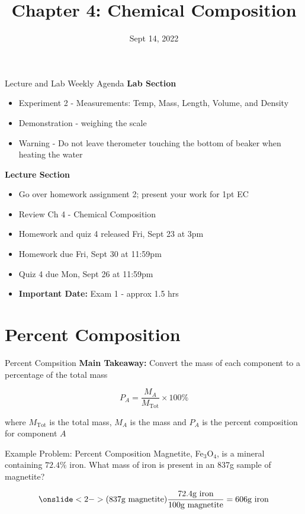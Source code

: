 \documentclass[11pt]{beamer}
\title{Chapter 4: Chemical Composition}
\institute{Chemistry Department, Cypress College}
\date{Sept 14, 2022}
\begin{document}
\begin{frame}
  \titlepage
\end{frame}

\begin{frame}{Lecture and Lab Weekly Agenda}
  \textbf{Lab Section}

  \begin{itemize}
  \item Experiment 2 - Measurements: Temp, Mass, Length, Volume,
    and Density
  \item Demonstration - weighing the scale
  \item Warning - Do not leave therometer touching the
    bottom of beaker when heating the water
  \end{itemize}

  \textbf{Lecture Section}

  \begin{itemize}
  \item Go over homework assignment 2; present your work
    for 1pt EC
  \item Review Ch 4 - Chemical Composition
  \item Homework and quiz 4 released Fri, Sept 23 at 3pm
  \item Homework due Fri, Sept 30 at 11:59pm
  \item Quiz 4 due Mon, Sept 26 at 11:59pm
  \item \textbf{Important Date:} Exam 1 - approx 1.5 hrs
  \end{itemize}
\end{frame}

\section{Percent Composition}

\begin{frame}{Percent Compsition}
  \textbf{Main Takeaway:} Convert the mass of each component
  to a percentage of the total mass

  \begin{equation}
    P_A = \frac{M_A}{M_\text{Tot}} \times 100\%
  \end{equation}

  where $M_\text{Tot}$ is the total mass, $M_A$ is the mass and $P_A$
  is the percent composition for component $A$
\end{frame}

\begin{frame}{Example Problem: Percent Composition}
  Magnetite, Fe$_3$O$_4$, is a mineral containing $72.4\%$ iron. What
  mass of iron is present in an 837g sample of magnetite?

  \begin{align*}
   \onslide<2->{ (837 \text{g magnetite})\frac{72.4 \text{g iron}}{100 \text{g magnetite}}
    = 606 \text{g iron}}
  \end{align*}
  
\end{frame}
\end{document}
